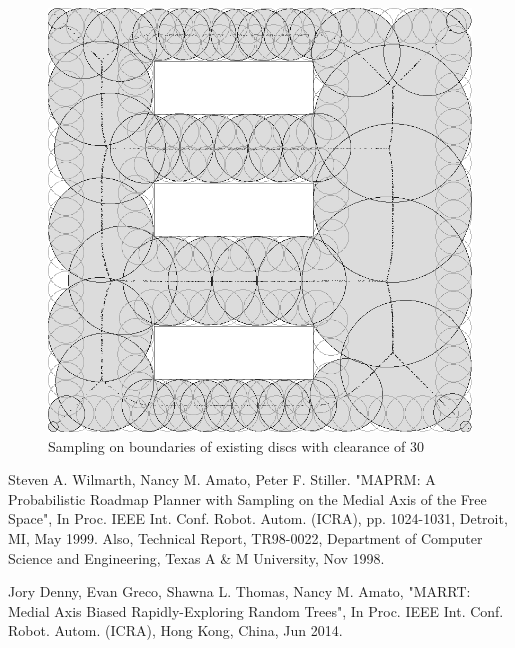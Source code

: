 \documentclass[12pt]{article}
\begin{document}
  \begin{figure}[p]
  \centering
  \includegraphics[scale=0.5]{MedialAxis_bnd_iso.PNG}  
  \caption{Sampling on boundaries of existing discs with clearance of 30}   
  \label{fig:MAISO_n} 
  \end{figure}   
  
  \begin{thebibliography}{1}

   Steven A. Wilmarth, Nancy M. Amato, Peter F. Stiller. "MAPRM: A Probabilistic Roadmap Planner with Sampling on the Medial Axis of the Free Space", In Proc. IEEE Int. Conf. Robot. Autom. (ICRA), pp. 1024-1031, Detroit, MI, May 1999. Also, Technical Report, TR98-0022, Department of Computer Science and Engineering, Texas A \& M University, Nov 1998.

   Jory Denny, Evan Greco, Shawna L. Thomas, Nancy M. Amato, "MARRT: Medial Axis Biased Rapidly-Exploring Random Trees",  In Proc. IEEE Int. Conf. Robot. Autom. (ICRA), Hong Kong, China, Jun 2014.

  \end{thebibliography}
  
\end{document}
